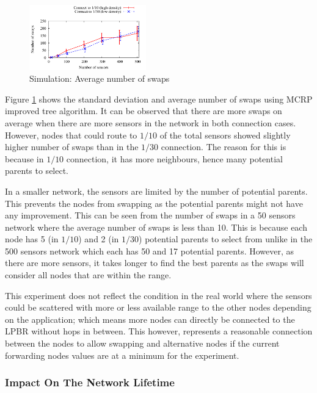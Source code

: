 \begin{figure}
\centering
\includegraphics[width=0.45\textwidth]{figures/swaps.pdf}
\caption{Simulation: Average number of swaps}
\label{fig:aveSwaps}
\end{figure}

Figure \ref{fig:aveSwaps} shows the standard deviation and average number of swaps using MCRP improved tree algorithm. 
It can be observed that there are more swaps on average when there are more sensors in the network in both connection cases. However, nodes that could route to $1/10$ of the total sensors showed slightly higher number of swaps than in the $1/30$ connection. The reason for this is because in $1/10$ connection, it has more neighbours, hence many potential parents to select. 

In a smaller network, the sensors are limited by the number of potential parents. This prevents the nodes from swapping as the potential parents might not have any improvement. This can be seen from the number of swaps in a 50 sensors network where the average number of swaps is less than 10. This is because each node has 5 (in $1/10$) and 2 (in $1/30$) potential parents to select from unlike in the 500 sensors network which each has 50 and 17 potential parents. However, as there are more sensors, it takes longer to find the best parents as the swaps will consider all nodes that are within the range.

This experiment does not reflect the condition in the real world where the sensors could be scattered with more or less available range to the other nodes depending on the application; which means more nodes can directly be connected to the LPBR without hops in between. This however, represents a reasonable connection between the nodes to allow swapping and alternative nodes if the current forwarding nodes values are at a minimum for the experiment.


\subsubsection{Impact On The Network Lifetime}

